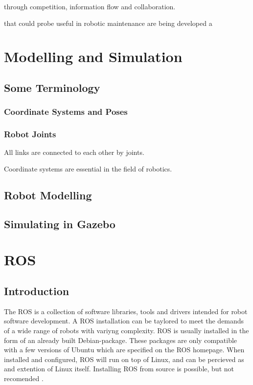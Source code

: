  through competition, information flow and collaboration.

 that could probe useful in robotic maintenance are being developed a

\section{Modelling and Simulation}

\subsection{Some Terminology}

\subsubsection{Coordinate Systems and Poses}

\subsubsection{Robot Joints}

All links are connected to each other by joints. 

Coordinate systems are essential in the field of robotics. 

\subsection{Robot Modelling}

\subsection{Simulating in Gazebo}

\section{ROS}

\subsection{Introduction}

The \ac{ROS} is a collection of software libraries, tools and drivers intended for robot software development. A \ac{ROS} installation can be taylored to meet the demands of a wide range of robots with variyng complexity. \ac{ROS} is usually installed in the form of an already built Debian-package. These packages are only compatible with a few versions of Ubuntu which are specified on the \ac{ROS} homepage. When installed and configured, \ac{ROS} will run on top of Linux, and can be percieved as and extention of Linux itself. Installing \ac{ROS} from source is possible, but not recomended \cite{ROS_install}.

